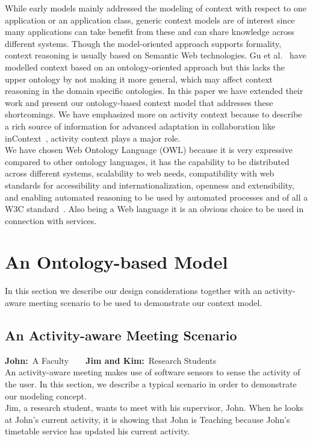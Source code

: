 \documentclass[copyright,creativecommons,noderivs,noncommercial]{eptcs}
\begin{document}
While early models mainly addressed the modeling of context with respect to one application or an application class, generic context models are of interest since many applications can take benefit from these and can share knowledge across different systems. Though the model-oriented approach supports formality, context reasoning is usually based on Semantic Web technologies. Gu et al.~\cite{k12} have modelled context based on an ontology-oriented approach but this lacks the upper ontology by not making it more general, which may affect context reasoning in the domain specific ontologies. In this paper we have extended their work and present our ontology-based context model that addresses these shortcomings. We have emphasized more on activity context because to describe a rich source of information for advanced adaptation in collaboration like inContext~\cite{k25}, activity context plays a major role.\\
We have chosen Web Ontology Language (OWL) because it is very expressive compared to other ontology languages, it has the capability to be distributed across different systems, scalability to web needs, compatibility with web standards for accessibility and internationalization, openness and extensibility, and enabling automated reasoning to be used by automated processes and of all a W3C standard~\cite{k1}. Also being a Web language it is an obvious choice to be used in connection with services.
\section{An Ontology-based Model}
In this section we describe our design considerations together with an activity-aware meeting scenario to be used to demonstrate our context model.
\subsection{An Activity-aware Meeting Scenario}
\textbf{John:}~A Faculty~~~~\textbf{Jim and Kim:}~Research Students\\

\noindent An activity-aware meeting makes use of software sensors to sense the activity of the user. In this section, we describe a typical scenario in order to demonstrate our modeling concept.\\

\noindent Jim, a research student, wants to meet with his supervisor, John. When he looks at John's current activity, it is showing that John is Teaching because John's timetable service has updated his current activity.\\
\end{document}
